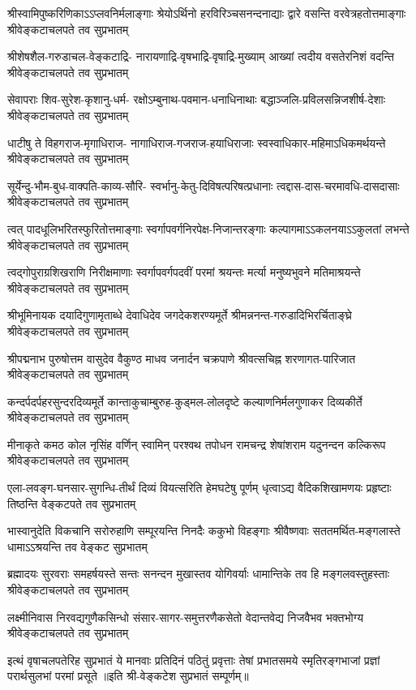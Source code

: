 \fourlineindentedshloka
{श्रीस्वामिपुष्करिणिकाऽऽप्लवनिर्मलाङ्गाः}
{श्रेयोऽर्थिनो हरविरिञ्चसनन्दनाद्याः}
{द्वारे वसन्ति वरवेत्रहतोत्तमाङ्गाः}
{श्रीवेङ्कटाचलपते तव सुप्रभातम्}

\fourlineindentedshloka
{श्रीशेषशैल-गरुडाचल-वेङ्कटाद्रि-}
{नारायणाद्रि-वृषभाद्रि-वृषाद्रि-मुख्याम्}
{आख्यां त्वदीय वसतेरनिशं वदन्ति}
{श्रीवेङ्कटाचलपते तव सुप्रभातम्}

\fourlineindentedshloka
{सेवापराः शिव-सुरेश-कृशानु-धर्म-}
{रक्षोऽम्बुनाथ-पवमान-धनाधिनाथाः}
{बद्धाञ्जलि-प्रविलसन्निजशीर्ष-देशाः}
{श्रीवेङ्कटाचलपते तव सुप्रभातम्}

\fourlineindentedshloka
{धाटीषु ते विहगराज-मृगाधिराज-}
{नागाधिराज-गजराज-हयाधिराजाः}
{स्वस्वाधिकार-महिमाऽधिकमर्थयन्ते}
{श्रीवेङ्कटाचलपते तव सुप्रभातम्}

\fourlineindentedshloka
{सूर्येन्दु-भौम-बुध-वाक्पति-काव्य-सौरि-}
{स्वर्भानु-केतु-दिविषत्परिषत्प्रधानाः}
{त्वद्दास-दास-चरमावधि-दासदासाः}
{श्रीवेङ्कटाचलपते तव सुप्रभातम्}

\fourlineindentedshloka
{त्वत् पादधूलिभरितस्फुरितोत्तमाङ्गाः}
{स्वर्गापवर्गनिरपेक्ष-निजान्तरङ्गाः}
{कल्पागमाऽऽकलनयाऽऽकुलतां लभन्ते}
{श्रीवेङ्कटाचलपते तव सुप्रभातम्}

\fourlineindentedshloka
{त्वद्गोपुराग्रशिखराणि निरीक्षमाणाः}
{स्वर्गापवर्गपदवीं परमां श्रयन्तः}
{मर्त्या मनुष्यभुवने मतिमाश्रयन्ते}
{श्रीवेङ्कटाचलपते तव सुप्रभातम्}

\fourlineindentedshloka
{श्रीभूमिनायक दयादिगुणामृताब्धे}
{देवाधिदेव जगदेकशरण्यमूर्ते}
{श्रीमन्ननन्त-गरुडादिभिरर्चिताङ्घ्रे}
{श्रीवेङ्कटाचलपते तव सुप्रभातम्}

\fourlineindentedshloka
{श्रीपद्मनाभ पुरुषोत्तम वासुदेव}
{वैकुण्ठ माधव जनार्दन चक्रपाणे}
{श्रीवत्सचिह्न शरणागत-पारिजात}
{श्रीवेङ्कटाचलपते तव सुप्रभातम्}

\fourlineindentedshloka
{कन्दर्पदर्पहरसुन्दरदिव्यमूर्ते}
{कान्ताकुचाम्बुरुह-कुड्मल-लोलदृष्टे}
{कल्याणनिर्मलगुणाकर दिव्यकीर्ते}
{श्रीवेङ्कटाचलपते तव सुप्रभातम्}

\fourlineindentedshloka
{मीनाकृते कमठ कोल नृसिंह वर्णिन्}
{स्वामिन् परश्वथ तपोधन रामचन्द्र}
{शेषांशराम यदुनन्दन कल्किरूप}
{श्रीवेङ्कटाचलपते तव सुप्रभातम्}

\fourlineindentedshloka
{एला-लवङ्ग-घनसार-सुगन्धि-तीर्थं}
{दिव्यं वियत्सरिति हेमघटेषु पूर्णम्}
{धृत्वाऽद्य वैदिकशिखामणयः प्रहृष्टाः}
{तिष्ठन्ति वेङ्कटपते तव सुप्रभातम्}

\fourlineindentedshloka
{भास्वानुदेति विकचानि सरोरुहाणि}
{सम्पूरयन्ति निनदैः ककुभो विहङ्गाः}
{श्रीवैष्णवाः सततमर्थित-मङ्गलास्ते}
{धामाऽऽश्रयन्ति तव वेङ्कट सुप्रभातम्}

\fourlineindentedshloka
{ब्रह्मादयः सुरवराः समहर्षयस्ते}
{सन्तः सनन्दन मुखास्तव योगिवर्याः}
{धामान्तिके तव हि मङ्गलवस्तुहस्ताः}
{श्रीवेङ्कटाचलपते तव सुप्रभातम्}

\fourlineindentedshloka
{लक्ष्मीनिवास निरवद्यगुणैकसिन्धो}
{संसार-सागर-समुत्तरणैकसेतो}
{वेदान्तवेद्य निजवैभव भक्तभोग्य}
{श्रीवेङ्कटाचलपते तव सुप्रभातम्}

\fourlineindentedshloka
{इत्थं वृषाचलपतेरिह सुप्रभातं}
{ये मानवाः प्रतिदिनं पठितुं प्रवृत्ताः}
{तेषां प्रभातसमये स्मृतिरङ्गभाजां}
{प्रज्ञां परार्थसुलभां परमां प्रसूते}
॥इति श्री-वेङ्कटेश सुप्रभातं सम्पूर्णम्॥